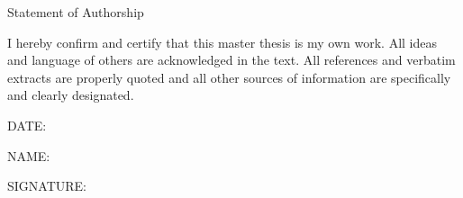 \pagebreak



{\LARGE Statement of Authorship}



I hereby confirm and certify that this master thesis is my own work. All ideas and language of others are acknowledged in the text. All references and verbatim extracts are properly quoted and all other sources of information are specifically and clearly designated. 



DATE:




NAME:




SIGNATURE:


